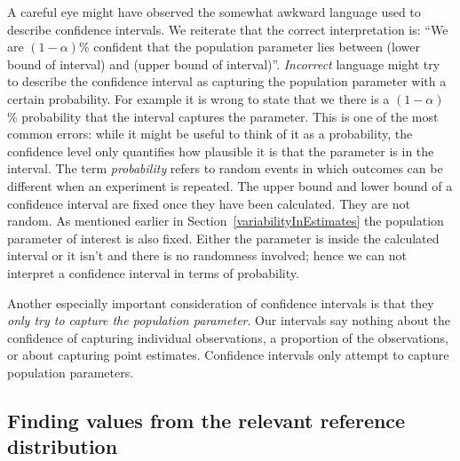 A careful eye might have observed the somewhat awkward language used to describe confidence intervals. We reiterate that the correct interpretation is:
``We are $(1-\alpha)$\% confident that the population parameter lies between 
(lower bound of interval) and (upper bound of interval)''.
\emph{Incorrect} language might try to describe the confidence interval as capturing the population parameter with a certain probability. 
For example it is wrong to state that we there is a $(1-\alpha)$\% probability that the interval captures the parameter.
This is one of the most common errors: while it might be useful to think of it as a probability, the confidence level only quantifies how plausible it is that the parameter is in the interval.
The term \emph{probability} refers to random events in which outcomes can be different when
an experiment is repeated.
The upper bound and lower bound of a confidence interval are fixed once they have been calculated.
They are not random.
As mentioned earlier in Section~\ref{variabilityInEstimates} the population parameter of interest is also fixed.
Either the parameter is inside the calculated interval or it isn't and there is no randomness involved; 
hence we can not interpret a confidence interval in terms of probability.

Another especially important consideration of confidence intervals is that they \emph{only try to capture the population parameter}. Our intervals say nothing about the confidence of capturing individual observations, a proportion of the observations, or about capturing point estimates. Confidence intervals only attempt to capture population parameters.






\subsection{Finding values from the relevant reference distribution}
\label{sectionFindingValuesFromTheRelevantRefDistrib}


